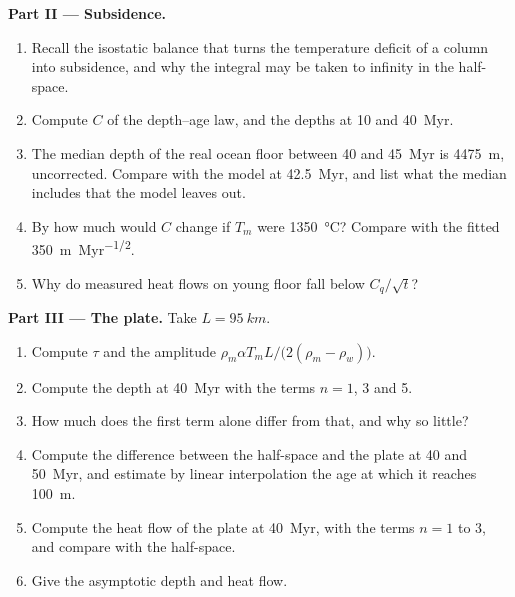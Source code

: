 \begin{problem}
\medskip\noindent\textbf{Part II --- Subsidence.}
\begin{enumerate}[resume]
  \item Recall the isostatic balance that turns the temperature deficit of a
        column into subsidence, and why the integral may be taken to infinity
        in the half-space.
  \item Compute $C$ of the depth--age law, and the depths at 10 and
        \qty{40}{Myr}.
  \item The median depth of the real ocean floor between 40 and \qty{45}{Myr}
        is \qty{4475}{m}, uncorrected. Compare with the model at
        \qty{42.5}{Myr}, and list what the median includes that the model
        leaves out.
  \item By how much would $C$ change if $T_m$ were \qty{1350}{\celsius}?
        Compare with the fitted \qty{350}{m.Myr^{-1/2}}.
  \item Why do measured heat flows on young floor fall below $C_q/\sqrt t$?
\end{enumerate}

\medskip\noindent\textbf{Part III --- The plate.} Take $L = \qty{95}{km}$.
\begin{enumerate}[resume]
  \item Compute $\tau$ and the amplitude $\rho_m\alpha T_mL/\bigl(2(\rho_m -
        \rho_w)\bigr)$.
  \item Compute the depth at \qty{40}{Myr} with the terms $n = 1$, 3 and 5.
  \item How much does the first term alone differ from that, and why so
        little?
  \item Compute the difference between the half-space and the plate at 40 and
        \qty{50}{Myr}, and estimate by linear interpolation the age at which
        it reaches \qty{100}{m}.
  \item Compute the heat flow of the plate at \qty{40}{Myr}, with the terms
        $n = 1$ to 3, and compare with the half-space.
  \item Give the asymptotic depth and heat flow.
\end{enumerate}


\end{problem}
